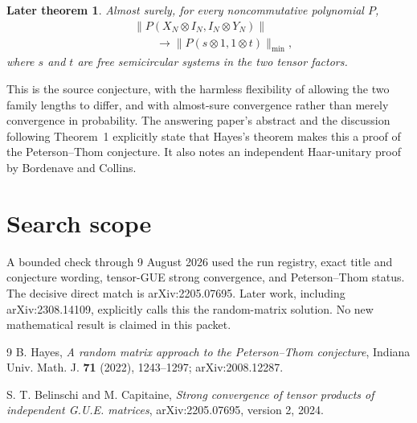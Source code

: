 \documentclass[11pt]{article}
\newtheorem*{answer}{Later theorem}
\begin{document}
\begin{answer}
Almost surely, for every noncommutative polynomial $P$,
\[
 \begin{split}
 &\|P(X_N\otimes I_N,I_N\otimes Y_N)\|\\
 &\qquad\longrightarrow
 \|P(s\otimes 1,1\otimes t)\|_{\min},
 \end{split}
\]
where $s$ and $t$ are free semicircular systems in the two tensor factors.
\end{answer}

This is the source conjecture, with the harmless flexibility of allowing the
two family lengths to differ, and with almost-sure convergence rather than
merely convergence in probability.  The answering paper's abstract and the
discussion following Theorem~1 explicitly state that Hayes's theorem makes
this a proof of the Peterson--Thom conjecture.  It also notes an independent
Haar-unitary proof by Bordenave and Collins.

\section*{Search scope}

A bounded check through 9 August 2026 used the run registry, exact title and
conjecture wording, tensor-GUE strong convergence, and Peterson--Thom status.
The decisive direct match is arXiv:2205.07695.  Later work, including
arXiv:2308.14109, explicitly calls this the random-matrix solution.  No new
mathematical result is claimed in this packet.

\begin{thebibliography}{9}
B. Hayes,
\emph{A random matrix approach to the Peterson--Thom conjecture},
Indiana Univ. Math. J. \textbf{71} (2022), 1243--1297;
arXiv:2008.12287.

S. T. Belinschi and M. Capitaine,
\emph{Strong convergence of tensor products of independent G.U.E. matrices},
arXiv:2205.07695, version 2, 2024.
\end{thebibliography}
\end{document}
